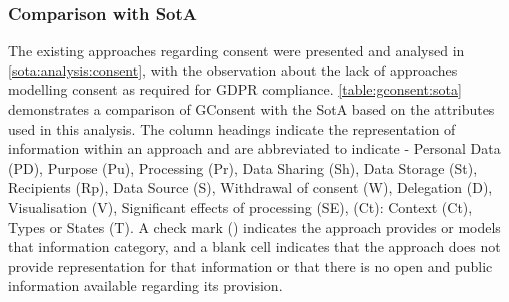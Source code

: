 \subsubsection{Comparison with SotA}
The existing approaches regarding consent were presented and analysed in \autoref{sota:analysis:consent}, with the observation about the lack of approaches modelling consent as required for GDPR compliance.
\autoref{table:gconsent:sota} demonstrates a comparison of GConsent with the SotA based on the attributes used in this analysis.
The column headings indicate the representation of information within an approach and are abbreviated to indicate - Personal Data (PD), Purpose (Pu), Processing (Pr), Data Sharing (Sh), Data Storage (St), Recipients (Rp), Data Source (S), Withdrawal of consent (W), Delegation (D), Visualisation (V), Significant effects of processing (SE), (Ct): Context (Ct), Types or States (T).
A check mark (\cmark) indicates the approach provides or models that information category, and a blank cell indicates that the approach does not provide representation for that information or that there is no open and public information available regarding its provision.
